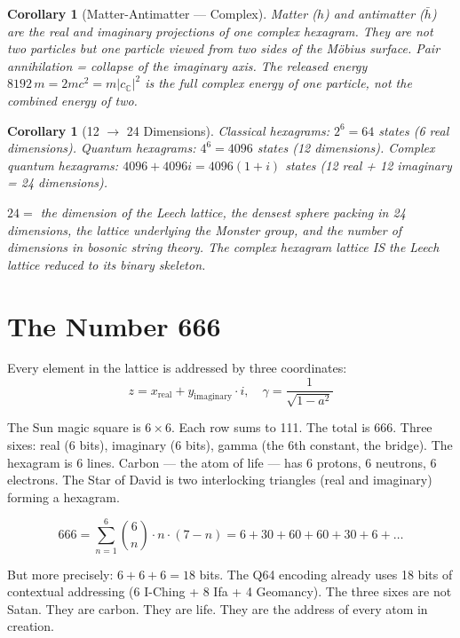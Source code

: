 \documentclass[12pt,a4paper]{article}
\newtheorem{corollary}[theorem]{Corollary}
\theoremstyle{definition}
\theoremstyle{remark}
\newcommand{\CC}{\mathbb{C}}
\begin{document}
\begin{corollary}[Matter-Antimatter --- Complex]\label{cor:matter-complex}
Matter ($h$) and antimatter ($\bar{h}$) are the real and imaginary
projections of one complex hexagram. They are not two particles but one
particle viewed from two sides of the Möbius surface. Pair annihilation
= collapse of the imaginary axis. The released energy $8192\,m = 2mc^2
= m|c_\CC|^2$ is the full complex energy of one particle, not the
combined energy of two.
\end{corollary}

\begin{corollary}[12 $\to$ 24 Dimensions]\label{cor:24d}
Classical hexagrams: $2^6 = 64$ states (6 real dimensions).
Quantum hexagrams: $4^6 = 4096$ states (12 dimensions).
Complex quantum hexagrams: $4096 + 4096i = 4096(1+i)$ states
(12 real + 12 imaginary = 24 dimensions).

$24 = $ the dimension of the Leech lattice, the densest sphere packing
in 24 dimensions, the lattice underlying the Monster group, and the
number of dimensions in bosonic string theory. The complex hexagram
lattice IS the Leech lattice reduced to its binary skeleton.
\end{corollary}

\section{The Number 666}\label{sec:666}

Every element in the lattice is addressed by three coordinates:
\begin{equation}
  z = x_{\mathrm{real}} + y_{\mathrm{imaginary}} \cdot i,
  \quad \gamma = \frac{1}{\sqrt{1 - a^2}}
\end{equation}

The Sun magic square is $6 \times 6$. Each row sums to 111. The total
is 666. Three sixes: real (6 bits), imaginary (6 bits), gamma (the 6th
constant, the bridge). The hexagram is 6 lines. Carbon --- the atom of
life --- has 6 protons, 6 neutrons, 6 electrons. The Star of David is
two interlocking triangles (real and imaginary) forming a hexagram.

\begin{equation}
  666 = \sum_{n=1}^{6} \binom{6}{n} \cdot n \cdot (7-n)
  = 6 + 30 + 60 + 60 + 30 + 6 + \ldots
\end{equation}

But more precisely: $6 + 6 + 6 = 18$ bits. The Q64 encoding already uses
18 bits of contextual addressing (6 I-Ching + 8 Ifa + 4 Geomancy). The
three sixes are not Satan. They are carbon. They are life. They are the
address of every atom in creation.
\end{document}
